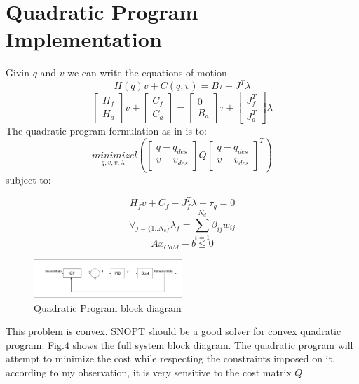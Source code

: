 \documentclass[conference]{IEEEtran}
\begin{document}
\section{Quadratic Program Implementation}
Givin $q$ and $v$ we can write the equations of motion
\begin{equation}
    H(q)\dot{v} + C(q,v) = B\tau + J^T\lambda
\end{equation}
\begin{equation}
    \begin{bmatrix}
        H_f\\
        H_a
    \end{bmatrix}\dot{v} + 
    \begin{bmatrix}
        C_f\\
        C_a
    \end{bmatrix}= 
    \begin{bmatrix}
        0\\
        B_a
    \end{bmatrix}\tau + 
    \begin{bmatrix}
        J_f^T\\
        J_a^T
    \end{bmatrix}\lambda
\end{equation}
The quadratic program formulation as in \cite{paper} is to: 
\begin{equation}
    \underset{q,v,\dot{v},\lambda}{minimize} l(
        \begin{bmatrix}
            q-q_{des}\\
            v-v_{des}
        \end{bmatrix}
        Q
        \begin{bmatrix}
            q-q_{des}\\
            v-v_{des}
        \end{bmatrix}^T
    )
\end{equation}
subject to:

\begin{equation} \tag{unactuated dynamics}
    H_f\dot{v} + C_f - J_f^T\lambda - \tau_g = 0
\end{equation}
\begin{equation} \tag{friction}
    \forall_{j=\{1..N_c\}}\lambda_f = \sum\limits_{i=1}^{N_d}\beta_{ij}w_{ij}
\end{equation}
\begin{equation} \tag{CoM inside the feet pressure cone}
    Ax_{CoM} - b \le 0
\end{equation}
\begin{figure}
    \includegraphics[width=0.5\textwidth]{figures/QP.png}
    \caption{Quadratic Program block diagram}
    \label{fig:QP}
\end{figure}
This problem is convex. SNOPT should be a good solver for convex quadratic program. 
Fig.4 shows the full system block diagram. The quadratic program will attempt to minimize the cost 
while respecting the constraints imposed on it.
according to my observation, it is very sensitive to the cost matrix $Q$. 
\end{document}
